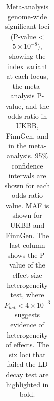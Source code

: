     \begin{table}[H]

      \centering

      \caption{\label{tab:table:meta_gws}Meta-analysis genome-wide significant loci (P-value < $5\times10^{-8}$), showing the index variant at each locus, the meta-analysis P-value, and the odds ratio in UKBB, FinnGen, and in the meta-analysis. 95\% confidence intervals are shown for each odds ratio value. MAF is shown for UKBB and FinnGen. The last column shows the P-value of the effect size heterogeneity test, where $P_{het} < 4\times10^{-3}$ suggests evidence of heterogeneity of effects. The six loci that failed the LD decay test are highlighted in bold.}
      \fontsize{8.5}{11}\selectfont
      \begin{adjustwidth}{-.5in}{-.5in}  

      \begin{tabular}[t]{p{}llllp{}p{}p{}}


\end{tabular}
\end{adjustwidth}
\end{table}
